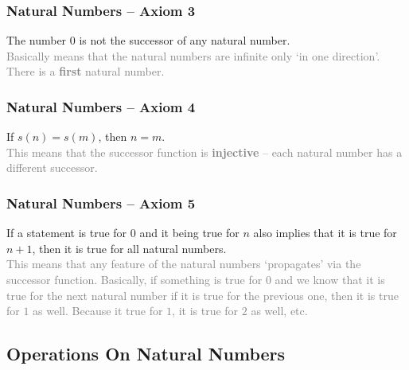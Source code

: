 \documentclass[aspectratio=169,11pt,svgnames]{beamer}
\begin{document}
\begin{frame}
 \frametitle{Natural Numbers -- Axiom 3}
 \begin{center}
  \Large The number $0$ is not the successor of any natural number.\\
  \pause
  \vspace{\parskip}
  \normalsize\textcolor{Gray}{Basically means that the natural numbers are
  infinite only `in one direction'. There is a \textbf{first} natural number.}
 \end{center}
\end{frame}

\begin{frame}
 \frametitle{Natural Numbers -- Axiom 4}
 \begin{center}
  \Large If $s(n) = s(m)$, then $n = m$.\\
  \pause
  \vspace{\parskip}
  \normalsize\textcolor{Gray}{This means that the successor function is
  \textbf{injective} -- each natural number has a different successor.}
 \end{center}
\end{frame}

\begin{frame}
 \frametitle{Natural Numbers -- Axiom 5}
 \begin{center}
  \Large If a statement is true for $0$ and it being true for
   $n$ also implies that it is true for $n + 1$, then it is true for all natural
   numbers.\\
  \pause
  \vspace{\parskip}
  \normalsize\textcolor{Gray}{This means that any feature of the natural
   numbers `propagates' via the successor function. Basically, if something is
   true for $0$ and we know that it is true for the next natural number if it is
   true for the previous one, then it is true for $1$ as well. Because it true
   for $1$, it is true for $2$ as well, etc.}
 \end{center}
\end{frame}

\subsection{Operations On Natural Numbers}

\begin{frame}
 \subsectionpage
\end{frame}
\end{document}
